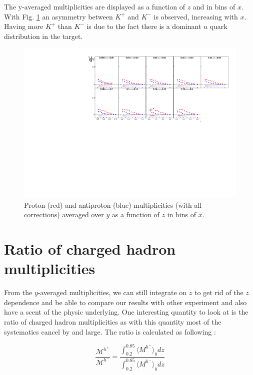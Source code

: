 The y-averaged multiplicities are displayed as a function of $z$ and in bins of $x$. With Fig. \ref{pic:mpyavg} an asymmetry between $K^+$ and $K^-$ is observed, increasing with $x$. Having more $K^+$ than $K^-$ is due to the fact there is a dominant $u$ quark distribution in the target.

\begin{figure}[!h]
  \centering
	\includegraphics[scale=0.85]{./gfx/pyavg.pdf}
	\caption{Proton (red) and antiproton (blue) multiplicities (with all corrections) averaged over $y$ as a function of $z$ in bins of $x$.}
	\label{pic:mpyavg}
\end{figure}

\newpage

\section{Ratio of charged hadron multiplicities}

From the $y$-averaged multiplicities, we can still integrate on $z$ to get rid of the $z$ dependence and be able to compare our results with other experiment and also have a scent of the physic underlying. One interesting quantity to look at is the ratio of charged hadron multiplicities as with this quantity most of the systematics cancel by and large. The ratio is calculated as following :

\begin{equation}
  \frac{\mathscr{M}^{h^+}}{\mathscr{M}^{h^-}} = \frac{\int_{0.2}^{0.85} \langle M^{h^+} \rangle_y dz}{\int_{0.2}^{0.85} \langle M^{h^-} \rangle_y dz}
\end{equation}

